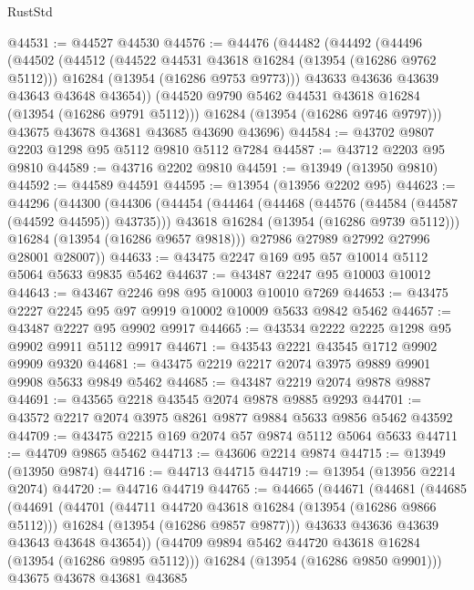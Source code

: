 \begin{lexlean}{RustStd}
\begin{coremodule}
@44531 := @44527 @44530
@44576 := @44476
    (@44482
      (@44492
        (@44496
          (@44502
            (@44512
              (@44522 @44531 @43618 @16284 (@13954 (@16286 @9762 @5112)))
              @16284
              (@13954 (@16286 @9753 @9773)))
            @43633
            @43636
            @43639
            @43643
            @43648
            @43654))
        (@44520 @9790 @5462 @44531 @43618 @16284 (@13954 (@16286 @9791 @5112)))
        @16284
        (@13954 (@16286 @9746 @9797)))
      @43675
      @43678
      @43681
      @43685
      @43690
      @43696)
@44584 := @43702 @9807 @2203 @1298 @95 @5112 @9810 @5112 @7284
@44587 := @43712 @2203 @95 @9810
@44589 := @43716 @2202 @9810
@44591 := @13949 (@13950 @9810)
@44592 := @44589 @44591
@44595 := @13954 (@13956 @2202 @95)
@44623 := @44296
    (@44300
      (@44306
        (@44454
          (@44464
            (@44468 (@44576 (@44584 (@44587 (@44592 @44595)) @43735)))
            @43618
            @16284
            (@13954 (@16286 @9739 @5112)))
          @16284
          (@13954 (@16286 @9657 @9818)))
        @27986
        @27989
        @27992
        @27996
        @28001
        @28007))
@44633 := @43475 @2247 @169 @95 @57 @10014 @5112 @5064 @5633 @9835 @5462
@44637 := @43487 @2247 @95 @10003 @10012
@44643 := @43467 @2246 @98 @95 @10003 @10010 @7269
@44653 := @43475 @2227 @2245 @95 @97 @9919 @10002 @10009 @5633 @9842 @5462
@44657 := @43487 @2227 @95 @9902 @9917
@44665 := @43534 @2222 @2225 @1298 @95 @9902 @9911 @5112 @9917
@44671 := @43543 @2221 @43545 @1712 @9902 @9909 @9320
@44681 := @43475 @2219 @2217 @2074 @3975 @9889 @9901 @9908 @5633 @9849 @5462
@44685 := @43487 @2219 @2074 @9878 @9887
@44691 := @43565 @2218 @43545 @2074 @9878 @9885 @9293
@44701 := @43572 @2217 @2074 @3975 @8261 @9877 @9884 @5633 @9856 @5462 @43592
@44709 := @43475 @2215 @169 @2074 @57 @9874 @5112 @5064 @5633
@44711 := @44709 @9865 @5462
@44713 := @43606 @2214 @9874
@44715 := @13949 (@13950 @9874)
@44716 := @44713 @44715
@44719 := @13954 (@13956 @2214 @2074)
@44720 := @44716 @44719
@44765 := @44665
    (@44671
      (@44681
        (@44685
          (@44691
            (@44701
              (@44711 @44720 @43618 @16284 (@13954 (@16286 @9866 @5112)))
              @16284
              (@13954 (@16286 @9857 @9877)))
            @43633
            @43636
            @43639
            @43643
            @43648
            @43654))
        (@44709 @9894 @5462 @44720 @43618 @16284 (@13954 (@16286 @9895 @5112)))
        @16284
        (@13954 (@16286 @9850 @9901)))
      @43675
      @43678
      @43681
      @43685

\end{coremodule}
\end{lexlean}

